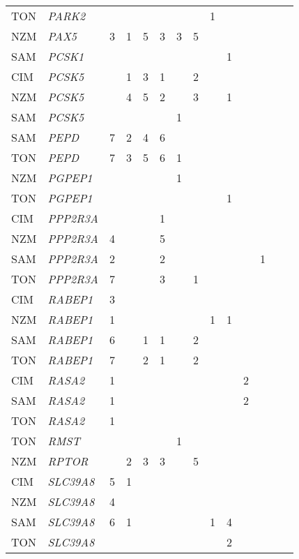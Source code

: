 \documentclass[]{report}
\begin{document}
\begin{ThreePartTable}
\begin{longtable}[t]{llllllllllllll}
TON & \em{PARK2} &  &  &  &  &  &  & 1 &  &  &  &  & \\
NZM & \em{PAX5} & 3 & 1 & 5 & 3 & 3 & 5 &  &  &  &  &  & \\
SAM & \em{PCSK1} &  &  &  &  &  &  &  & 1 &  &  &  & \\
CIM & \em{PCSK5} &  & 1 & 3 & 1 &  & 2 &  &  &  &  &  & \\
NZM & \em{PCSK5} &  & 4 & 5 & 2 &  & 3 &  & 1 &  &  &  & \\
SAM & \em{PCSK5} &  &  &  &  & 1 &  &  &  &  &  &  & \\
SAM & \em{PEPD} & 7 & 2 & 4 & 6 &  &  &  &  &  &  &  & \\
TON & \em{PEPD} & 7 & 3 & 5 & 6 & 1 &  &  &  &  &  &  & \\
NZM & \em{PGPEP1} &  &  &  &  & 1 &  &  &  &  &  &  & \\
TON & \em{PGPEP1} &  &  &  &  &  &  &  & 1 &  &  &  & \\
CIM & \em{PPP2R3A} &  &  &  & 1 &  &  &  &  &  &  &  & \\
NZM & \em{PPP2R3A} & 4 &  &  & 5 &  &  &  &  &  &  &  & \\
SAM & \em{PPP2R3A} & 2 &  &  & 2 &  &  &  &  &  & 1 &  & \\
TON & \em{PPP2R3A} & 7 &  &  & 3 &  & 1 &  &  &  &  &  & \\
CIM & \em{RABEP1} & 3 &  &  &  &  &  &  &  &  &  &  & \\
NZM & \em{RABEP1} & 1 &  &  &  &  &  & 1 & 1 &  &  &  & \\
SAM & \em{RABEP1} & 6 &  & 1 & 1 &  & 2 &  &  &  &  &  & \\
TON & \em{RABEP1} & 7 &  & 2 & 1 &  & 2 &  &  &  &  &  & \\
CIM & \em{RASA2} & 1 &  &  &  &  &  &  &  & 2 &  &  & \\
SAM & \em{RASA2} & 1 &  &  &  &  &  &  &  & 2 &  &  & \\
TON & \em{RASA2} & 1 &  &  &  &  &  &  &  &  &  &  & \\
TON & \em{RMST} &  &  &  &  & 1 &  &  &  &  &  &  & \\
NZM & \em{RPTOR} &  & 2 & 3 & 3 &  & 5 &  &  &  &  &  & \\
CIM & \em{SLC39A8} & 5 & 1 &  &  &  &  &  &  &  &  &  & \\
NZM & \em{SLC39A8} & 4 &  &  &  &  &  &  &  &  &  &  & \\
SAM & \em{SLC39A8} & 6 & 1 &  &  &  &  & 1 & 4 &  &  &  & \\
TON & \em{SLC39A8} &  &  &  &  &  &  &  & 2 &  &  &  & \\

\end{longtable}
\end{ThreePartTable}
\end{document}
